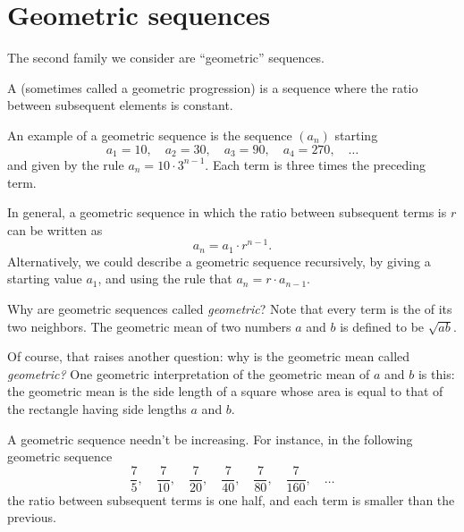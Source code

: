 \documentclass{ximera}
\begin{document}
\section{Geometric sequences}


The second family we consider are ``geometric'' sequences.

\begin{definition}
  A  (sometimes called a geometric
  progression) is a sequence where the
  ratio between subsequent elements is constant.
\end{definition}

\begin{example}
  An example of a geometric sequence is the sequence $(a_n)$ starting
  $$
  a_1 = 10, \quad a_2 = 30, \quad a_3 = 90, \quad a_4 = 270, \quad\ldots
  $$
  and given by the rule $a_n = 10 \cdot 3^{n-1}$.  Each term is three
  times the preceding term.
\end{example}

In general, a geometric sequence in which the ratio between
subsequent terms is $r$ can be written as
$$
a_n = a_1 \cdot r^{n-1}.
$$
Alternatively, we could describe a geometric sequence
recursively, by giving a starting value $a_1$, and using the rule that
$a_{n} = r \cdot a_{n-1}$.

\begin{remark}
Why are geometric sequences called \textit{geometric}?  Note that
every term is the  of its two neighbors.  The
geometric mean of two numbers $a$ and $b$ is defined to be
$\sqrt{ab}$.

Of course, that raises another question: why is the geometric mean
called \textit{geometric?}  One geometric interpretation of the
geometric mean of $a$ and $b$ is this: the geometric mean is the side
length of a square whose area is equal to that of the rectangle having
side lengths $a$ and $b$.
\end{remark}

A geometric sequence needn't be increasing.  For instance, in the following geometric sequence
$$
\frac{7}{5}, \quad \frac{7}{10}, \quad \frac{7}{20}, \quad \frac{7}{40}, \quad \frac{7}{80}, \quad \frac{7}{160}, \quad\ldots
$$
the ratio between subsequent terms is one half, and each term is smaller than the previous.
\end{document}
